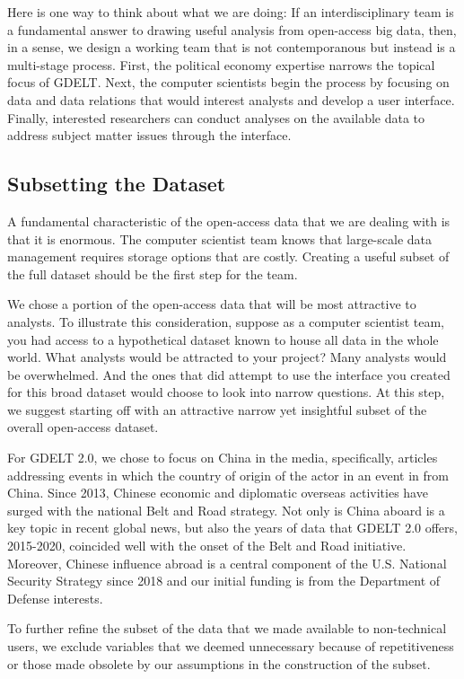 \documentclass[preprint,authoryear,12pt]{elsarticle/elsarticle}
\begin{document}
Here is one way to think about what we are doing: If an interdisciplinary team is a fundamental answer to drawing useful analysis from open-access big data, then, in a sense, we design a working team that is not contemporanous but instead is a multi-stage process. First, the political economy expertise narrows the topical focus of GDELT. Next, the computer scientists begin the process by focusing on data and data relations that would interest analysts and develop a user interface. Finally, interested researchers can conduct analyses on the available data to address subject matter issues through the interface. 

\subsection{Subsetting the Dataset}
\label{sec:subset}
A fundamental characteristic of the open-access data that we are dealing with is that it is enormous. The computer scientist team knows that large-scale data management requires storage options that are costly. Creating a useful subset of the full dataset should be the first step for the team. 

We chose a portion of the open-access data that will be most attractive to analysts. To illustrate this consideration, suppose as a computer scientist team, you had access to a hypothetical dataset known to house all data in the whole world. What analysts would be attracted to your project? Many analysts would be overwhelmed. And the ones that did attempt to use the interface you created for this broad dataset would choose to look into narrow questions. At this step, we suggest starting off with an attractive narrow yet insightful subset of the overall open-access dataset.

For GDELT 2.0, we chose to focus on China in the media, specifically, articles addressing events in which the country of origin of the actor in an event in from China. Since 2013, Chinese economic and diplomatic overseas activities have surged with the national Belt and Road strategy. Not only is China aboard is a key topic in recent global news, but also the years of data that GDELT 2.0 offers, 2015-2020, coincided well with the onset of the Belt and Road initiative. Moreover, Chinese influence abroad is a central component of the U.S. National Security Strategy since 2018 and our initial funding is from the Department of Defense interests.

To further refine the subset of the data that we made available to non-technical users, we exclude variables that we deemed unnecessary because of repetitiveness or those made obsolete by our assumptions in the construction of the subset. 
\end{document}
